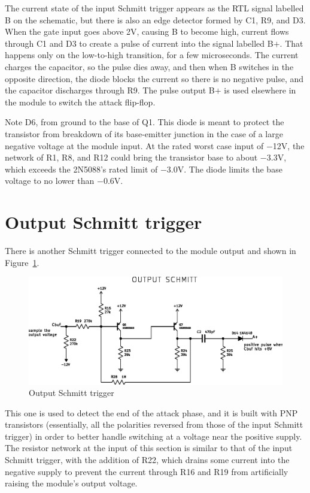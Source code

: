 The current state of the input Schmitt trigger appears as the RTL signal
labelled B on the schematic, but there is also an edge detector formed
by C1, R9, and D3.  When the gate input goes above 2V, causing B to become
high, current flows through C1 and D3 to create a pulse of current into the
signal labelled B$+$.  That happens only on the low-to-high transition, for
a few microseconds.  The current charges the capacitor, so the pulse dies
away, and then when B switches in the opposite direction, the diode blocks
the current so there is no negative pulse, and the capacitor discharges
through R9.  The pulse output B$+$ is used elsewhere in the module to switch
the attack flip-flop.

Note D6, from ground to the base of Q1.  This diode is meant to protect the
transistor from breakdown of its base-emitter junction in the case of a
large negative voltage at the module input.  At the rated worst case input
of $-$12V, the network of R1, R8, and R12 could bring the transistor base to
about $-$3.3V, which exceeds the 2N5088's rated limit of $-$3.0V.  The diode
limits the base voltage to no lower than $-$0.6V.

\section{Output Schmitt trigger}

There is another Schmitt trigger connected to the module output and shown in
Figure~\ref{fig:output-schmitt}.

\begin{figure}
  \centering\includegraphics{output-schmitt}\par
  \caption{Output Schmitt trigger}
  \label{fig:output-schmitt}
\end{figure}

This one is used to detect the end of the attack phase, and it is built with
PNP transistors (essentially, all the polarities reversed from those of the
input Schmitt trigger) in order to better handle switching at a voltage near
the positive supply.  The resistor network at the input of this section is
similar to that of the input Schmitt trigger, with the addition of R22,
which drains some current into the negative supply to prevent the
current through R16 and R19 from artificially raising the module's output
voltage.

